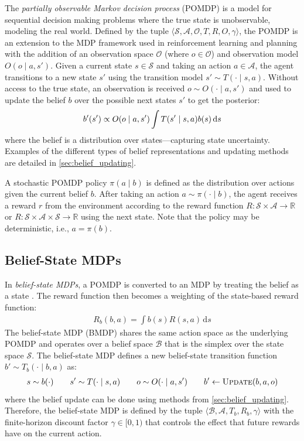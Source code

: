 The \textit{partially observable Markov decision process} (POMDP) \cite{cassandra1998exact,kaelbling1998planning,dmbook} is a model for sequential decision making problems where the true state is unobservable, modeling the real world.
Defined by the tuple $\langle \mathcal{S}, \mathcal{A}, \mathcal{O}, T, R, O, \gamma \rangle$, 
the POMDP is an extension to the MDP framework used in reinforcement learning and planning with the addition of an observation space $\mathcal{O}$ (where $o \in \mathcal{O}$) and observation model $O(o \mid a, s')$.
Given a current state $s \in \mathcal{S}$ and taking an action $a \in \mathcal{A}$, the agent transitions to a new state $s'$ using the transition model $s' \sim T(\cdot \mid s, a)$.
Without access to the true state, an observation is received $o \sim O(\cdot \mid a, s')$ and used to update the belief $b$ over the possible next states $s'$ to get the posterior:
\begin{equation}    
    b'(s') \propto O(o \mid a, s')\int T(s' \mid s, a)b(s) \mathop{}\!\mathrm{d} s
\end{equation}
where the belief is a distribution over states---capturing state uncertainty.
Examples of the different types of belief representations and updating methods are detailed in \cref{sec:belief_updating}.

A stochastic POMDP policy $\pi(a \mid b)$ is defined as the distribution over actions given the current belief $b$.
After taking an action $a \sim \pi(\cdot \mid b)$, the agent receives a reward $r$ from the environment according to the reward function $R: \mathcal{S} \times \mathcal{A} \to \mathbb{R}$ or $R: \mathcal{S} \times \mathcal{A} \times \mathcal{S} \to \mathbb{R}$ using the next state.
Note that the policy may be deterministic, i.e., $a = \pi(b)$.

\subsection{Belief-State MDPs}\label{sec:belief_state_mdps}
In \textit{belief-state MDPs}, a POMDP is converted to an MDP by treating the belief as a state \cite{kaelbling1998planning,dmbook}.
The reward function then becomes a weighting of the state-based reward function:
\begin{align}\label{eq:belief_reward}
    R_b(b,a) = \!\int b(s)R(s,a) \,\mathrm{d}s
\end{align}
The belief-state MDP (BMDP) shares the same action space as the underlying POMDP and operates over a belief space $\mathcal{B}$ that is the simplex over the state space $\mathcal{S}$. The belief-state MDP defines a new belief-state transition function $b' \sim T_b(\cdot \mid b, a)$ as:
\begin{align}
    s \sim b(\cdot) \qquad s' \sim T(\cdot \mid s, a) \qquad o \sim O(\cdot \mid a, s') \qquad b' \leftarrow \textsc{Update}(b, a, o) \label{eq:tb_update}
\end{align}
where the belief update can be done using methods from \cref{sec:belief_updating}.
Therefore, the belief-state MDP is defined by the tuple $\langle \mathcal{B}, \mathcal{A}, T_b, R_b, \gamma \rangle$ with the finite-horizon discount factor $\gamma \in [0,1)$ that controls the effect that future rewards have on the current action.

